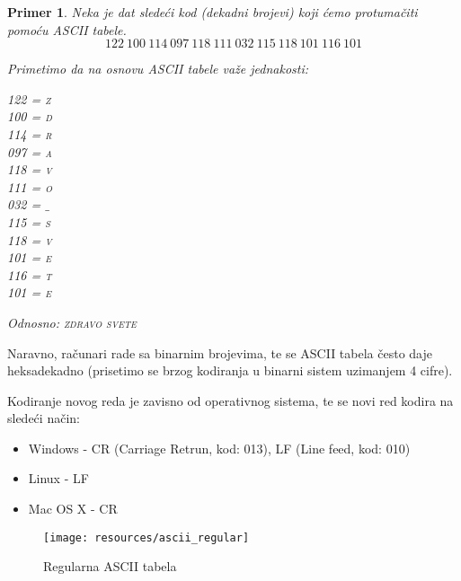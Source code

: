 \documentclass[a4paper]{article}
\newtheorem{primer}{Primer}[section]
\begin{document}
\begin{primer}
 Neka je dat sledeći kod (dekadni brojevi) koji ćemo protumačiti pomoću ASCII tabele.
 $$ 122 \ 100 \ 114 \ 097 \ 118 \ 111 \ 032 \ 115 \ 118 \ 101 \ 116 \ 101 $$
 
 Primetimo da na osnovu ASCII tabele važe jednakosti: \\
 \begin{center}
  \textsc{122 = z} \\
  \textsc{100 = d} \\ 
  \textsc{114 = r} \\
  \textsc{097 = a} \\ 
  \textsc{118 = v} \\
  \textsc{111 = o} \\
  \textsc{032 = $\_$} \\
  \textsc{115 = s} \\ 
  \textsc{118 = v} \\
  \textsc{101 = e} \\ 
  \textsc{116 = t} \\
  \textsc{101 = e} \\
  \end{center}
  
  Odnosno: \textsc{zdravo svete}
\end{primer}

Naravno, računari rade sa binarnim brojevima, te se ASCII tabela često daje heksadekadno (prisetimo se brzog kodiranja u binarni sistem uzimanjem 4 cifre).

Kodiranje novog reda je zavisno od operativnog sistema, te se novi red kodira na sledeći način:
\begin{itemize}
 \item Windows - CR (Carriage Retrun, kod: 013), LF (Line feed, kod: 010)
 \item Linux - LF
 \item Mac OS X - CR
\end{itemize}


\begin{figure}[h!]
  \begin{center}
    \texttt{[image: resources/ascii\_regular]}
  \end{center}
  \caption{Regularna ASCII tabela}
  \label{fig:ascii_reg}
\end{figure}
\end{document}
